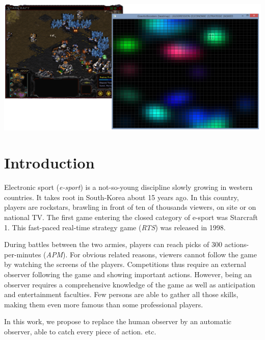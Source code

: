 \documentclass{jfsma}
\begin{document}
	\maketitle
	
	\begin{strip}
  \centering\noindent
  \includegraphics[scale=0.35]{gfx/GB}
\end{strip}

	\section{Introduction}
    	Electronic sport (\textit{e-sport}) is a not-so-young discipline slowly growing in western countries.
        It takes root in South-Korea about 15 years ago. 
        In this country, players are rockstars, brawling in front of ten of thousands viewers, on site or on national TV. %
        The first game entering the closed category of e-sport was Starcraft 1. %
        This fast-paced real-time strategy game (\textit{RTS}) was released in 1998.
        
        During battles between the two armies, players can reach picks of 300 actions-per-minutes (\textit{APM}).
        For obvious related reasons, viewers cannot follow the game by watching the screens of the players.
        Competitions thus require an external observer following the game and showing important actions.
        However, being an observer requires a comprehensive knowledge of the game as well as anticipation and entertainment faculties. 
        Few persons are able to gather all those skills, making them even more famous than some professional players.
        
        \medskip
        In this work, we propose to replace the human observer by an automatic observer, able to catch every piece of action.
        etc.
        
\end{document}
